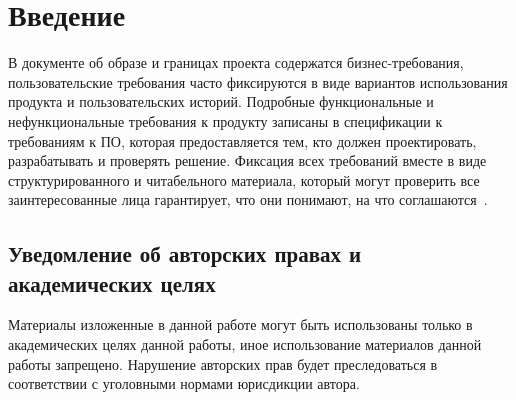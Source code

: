 \chapter*{Введение}
\label{ch:intro}

В документе об образе и границах проекта содержатся бизнес-требования, пользовательские требования часто фиксируются в
виде вариантов использования продукта и пользовательских историй.
Подробные функциональные и нефункциональные требования к продукту записаны в спецификации к требованиям к ПО,
которая предоставляется тем, кто должен проектировать, разрабатывать и проверять решение.
Фиксация всех требований вместе в виде структурированного и читабельного материала, который могут проверить
все заинтересованные лица гарантирует, что они понимают, на что соглашаются~\cite{vigers,vigersRu}.


\section*{Уведомление об авторских правах и академических целях}
\label{sec:copyright}

Материалы изложенные в данной работе могут быть использованы только в академических целях данной работы,
иное использование материалов данной работы запрещено.
Нарушение авторских прав будет преследоваться в соответствии с уголовными нормами юрисдикции автора.
\endinput

